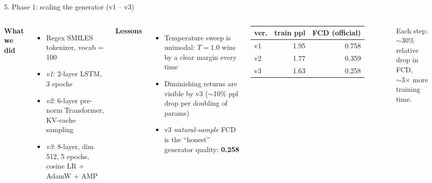 \documentclass[aspectratio=169,11pt]{beamer}
\begin{document}
\begin{frame}{5. Phase 1: scaling the generator (v1 -- v3)}
  \begin{columns}[T,onlytextwidth]
    \textbf{What we did}
    \begin{itemize}
      \item Regex SMILES tokenizer, vocab = 100
      \item \emph{v1}: 2-layer LSTM, 3 epochs
      \item \emph{v2}: 6-layer pre-norm Transformer, KV-cache sampling
      \item \emph{v3}: 8-layer, dim 512, 5 epochs, cosine LR + AdamW + AMP
    \end{itemize}

    \medskip
    \textbf{Lessons}
    \begin{itemize}
      \item Temperature sweep is unimodal: $T=1.0$ wins by a clear margin every time
      \item Diminishing returns are visible by v3 ($\sim$10\% ppl drop per doubling of params)
      \item v3 \emph{natural-sample} FCD is the ``honest'' generator quality: \textbf{0.258}
    \end{itemize}

    \centering
    \footnotesize
    \begin{tabular}{lrr}
      \toprule
      ver. & train ppl & FCD (official) \\
      \midrule
      v1 & 1.95 & 0.758 \\
      v2 & 1.77 & 0.359 \\
      v3 & 1.63 & 0.258 \\
      \bottomrule
    \end{tabular}

    \medskip
    \footnotesize
    Each step: $\sim$30\% relative drop in FCD,\\
    $\sim$3$\times$ more training time.
  \end{columns}
\end{frame}
\end{document}
